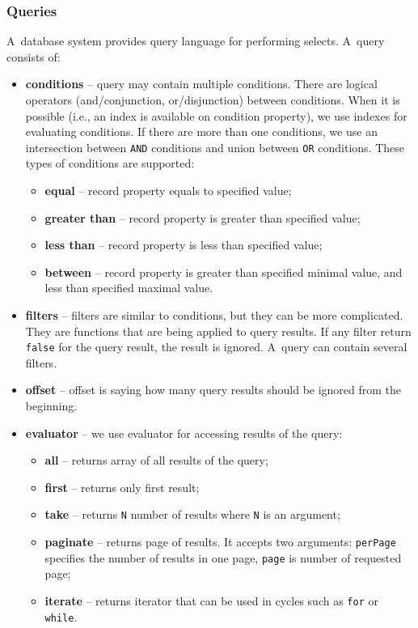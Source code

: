 \subsubsection{Queries} 
A~database system provides query language for performing selects. A~query consists of:
\begin{itemize}
    \item \textbf{conditions} -- query may contain multiple conditions. There are logical operators (and/conjunction, or/disjunction) between conditions. When it is possible (i.e., an index is available on condition property), we use indexes for evaluating conditions. If there are more than one conditions, we use an intersection between \texttt{AND} conditions and union between \texttt{OR} conditions. These types of conditions are supported:
    \begin{itemize}
        \item \textbf{equal} -- record property equals to specified value;
        \item \textbf{greater than} -- record property is greater than specified value;
        \item \textbf{less than} -- record property is less than specified value;
        \item \textbf{between} -- record property is greater than specified minimal value, and less than specified maximal value.
    \end{itemize} 
    \item \textbf{filters} -- filters are similar to conditions, but they can be more complicated. They are functions that are being applied to query results. If any filter return \texttt{false} for the query result, the result is ignored. A~query can contain several filters.
    \item \textbf{offset} -- offset is saying how many query results should be ignored from the beginning.
    \item \textbf{evaluator} -- we use evaluator for accessing results of the query:
    \begin{itemize}
        \item \textbf{all} -- returns array of all results of the query;
        \item \textbf{first} -- returns only first result;
        \item \textbf{take} -- returns \texttt{N} number of results where \texttt{N} is an argument;
        \item \textbf{paginate} -- returns page of results. It accepts two arguments: \texttt{perPage} specifies the number of results in one page, \texttt{page} is number of requested page;
        \item \textbf{iterate} -- returns iterator that can be used in cycles such as \texttt{for} or \texttt{while}.
    \end{itemize}
\end{itemize}  

